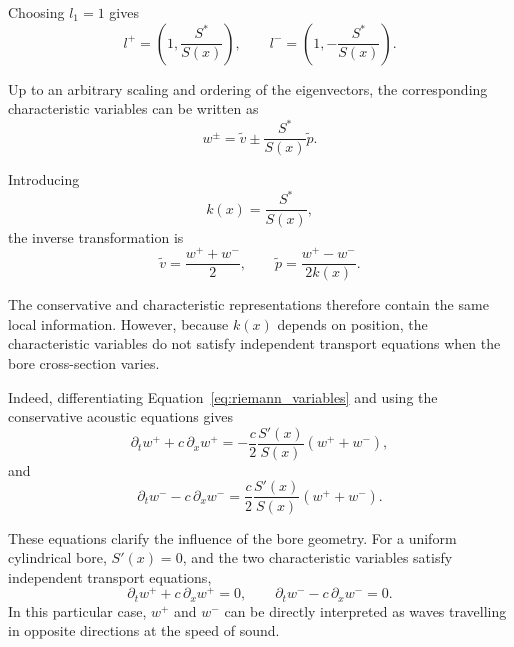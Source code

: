 \documentclass[11pt,a4paper]{report}
\theoremstyle{plain}
\theoremstyle{definition}
\begin{document}
Choosing \(l_1=1\) gives
\begin{equation}
l^+
=
\left(
1,
\frac{S^\ast}{S(x)}
\right),
\qquad
l^-
=
\left(
1,
-
\frac{S^\ast}{S(x)}
\right).
\end{equation}

Up to an arbitrary scaling and ordering of the eigenvectors, the corresponding
characteristic variables can be written as
\begin{equation}
\boxed{
w^\pm
=
\tilde v
\pm
\frac{S^\ast}{S(x)}
\tilde p.
}
\label{eq:riemann_variables}
\end{equation}

Introducing
\begin{equation}
k(x)=\frac{S^\ast}{S(x)},
\end{equation}
the inverse transformation is
\begin{equation}
\boxed{
\tilde v
=
\frac{w^++w^-}{2},
\qquad
\tilde p
=
\frac{w^+-w^-}{2k(x)}.
}
\label{eq:inverse_characteristic_transform}
\end{equation}

The conservative and characteristic representations therefore contain the
same local information. However, because \(k(x)\) depends on position, the
characteristic variables do not satisfy independent transport equations when
the bore cross-section varies.

Indeed, differentiating Equation~\eqref{eq:riemann_variables} and using the
conservative acoustic equations gives
\begin{equation}
\boxed{
\partial_t w^+
+
c\,\partial_x w^+
=
-\frac{c}{2}
\frac{S'(x)}{S(x)}
\left(w^+ + w^-\right),
}
\label{eq:characteristic_plus}
\end{equation}
and
\begin{equation}
\boxed{
\partial_t w^-
-
c\,\partial_x w^-
=
\frac{c}{2}
\frac{S'(x)}{S(x)}
\left(w^+ + w^-\right).
}
\label{eq:characteristic_minus}
\end{equation}

These equations clarify the influence of the bore geometry. For a uniform
cylindrical bore, \(S'(x)=0\), and the two characteristic variables satisfy
independent transport equations,
\begin{equation}
\partial_t w^+
+
c\,\partial_x w^+
=
0,
\qquad
\partial_t w^-
-
c\,\partial_x w^-
=
0.
\end{equation}
In this particular case, \(w^+\) and \(w^-\) can be directly interpreted as
waves travelling in opposite directions at the speed of sound.
\end{document}
